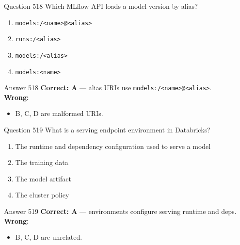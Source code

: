 \documentclass[aspectratio=169,11pt]{beamer}
\begin{document}
	\begin{frame}{Question 518}
		Which MLflow API loads a model version by alias?
		\begin{enumerate}[label=\Alph*.]
			\item \texttt{models:/<name>@<alias>}
			\item \texttt{runs:/<alias>}
			\item \texttt{models:/<alias>}
			\item \texttt{models:<name>}
		\end{enumerate}
	\end{frame}
	\begin{frame}{Answer 518}
		\textbf{Correct: A} --- alias URIs use \texttt{models:/<name>@<alias>}.\\
		\vspace{0.5em}
		\textbf{Wrong:}
		\begin{itemize}
			\item B, C, D are malformed URIs.
		\end{itemize}
	\end{frame}
	
	\begin{frame}{Question 519}
		What is a serving endpoint environment in Databricks?
		\begin{enumerate}[label=\Alph*.]
			\item The runtime and dependency configuration used to serve a model
			\item The training data
			\item The model artifact
			\item The cluster policy
		\end{enumerate}
	\end{frame}
	\begin{frame}{Answer 519}
		\textbf{Correct: A} --- environments configure serving runtime and deps.\\
		\vspace{0.5em}
		\textbf{Wrong:}
		\begin{itemize}
			\item B, C, D are unrelated.
		\end{itemize}
	\end{frame}
	
\end{document}
